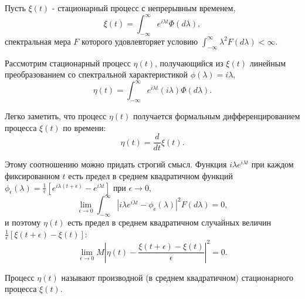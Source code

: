 \begin{example} Пусть $\xi(t)$ - стационарный процесс с непрерывным временем, $$\xi(t) = \int_{-\infty}^{\infty} e^{i \lambda t} \Phi(d \lambda),$$ спектральная мера $F$ которого удовлевторяет условию $\int_{-\infty}^{\infty} \lambda^2 F(d \lambda) < \infty.$

 Рассмотрим стационарный процесс $\eta(t)$, получающийся из $\xi(t)$ линейным преобразованием со спектральной характеристикой $\phi(\lambda) = i \lambda$, $$\eta(t) = \int_{-\infty}^{\infty} e^{i \lambda t} (i \lambda) \Phi(d \lambda).$$

 Легко заметить, что процесс $\eta(t)$ получается формальным дифференцированием процесса $\xi(t)$ по времени: $$\eta(t) = \frac{d}{dt}\xi(t).$$

 Этому соотношению можно придать строгий смысл. Функция $i \lambda e^{i \lambda t}$ при каждом фиксированном $t$ есть предел в среднем квадратичном функций $\phi_\epsilon(\lambda) = \frac{1}{\epsilon}\left[e^{i \lambda(t+\epsilon)} - e^{i \lambda t}\right]$ при $\epsilon \to 0$, $$\lim_{\epsilon \to 0} \int_{-\infty}^{\infty} \left|i \lambda e^{i \lambda t} - \phi_\epsilon(\lambda) \right|^2 F(d \lambda) = 0,$$ и поэтому $\eta(t)$ есть предел в среднем квадратичном случайных величин $\frac{1}{\epsilon} \left[\xi(t + \epsilon) - \xi(t)\right]$: $$\lim_{\epsilon \to 0} M \left|\eta(t) - \frac{\xi(t + \epsilon) - \xi(t)}{\epsilon}\right|^2 = 0.$$

 Процесс $\eta(t)$ называют производной (в среднем квадратичном) стационарного процесса $\xi(t)$.
\end{example}

